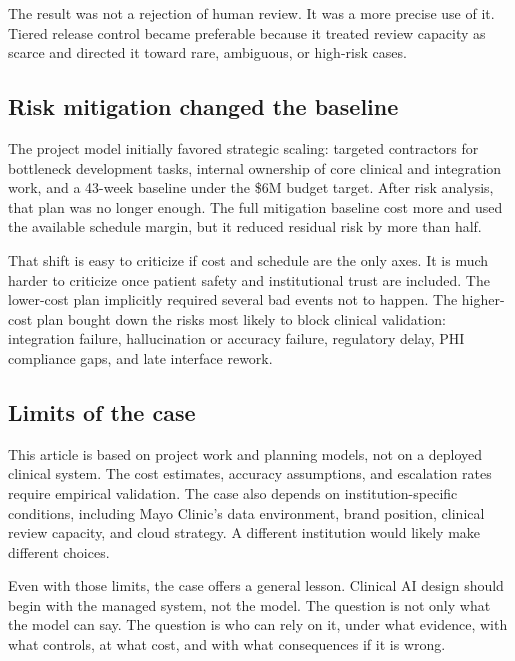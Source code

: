 The result was not a rejection of human review. It was a more precise use of it. Tiered release control became preferable because it treated review capacity as scarce and directed it toward rare, ambiguous, or high-risk cases.

\subsection{Risk mitigation changed the baseline}

The project model initially favored strategic scaling: targeted contractors for bottleneck development tasks, internal ownership of core clinical and integration work, and a 43-week baseline under the \$6M budget target. After risk analysis, that plan was no longer enough. The full mitigation baseline cost more and used the available schedule margin, but it reduced residual risk by more than half.

That shift is easy to criticize if cost and schedule are the only axes. It is much harder to criticize once patient safety and institutional trust are included. The lower-cost plan implicitly required several bad events not to happen. The higher-cost plan bought down the risks most likely to block clinical validation: integration failure, hallucination or accuracy failure, regulatory delay, PHI compliance gaps, and late interface rework.

\subsection{Limits of the case}

This article is based on project work and planning models, not on a deployed clinical system. The cost estimates, accuracy assumptions, and escalation rates require empirical validation. The case also depends on institution-specific conditions, including Mayo Clinic's data environment, brand position, clinical review capacity, and cloud strategy. A different institution would likely make different choices.

Even with those limits, the case offers a general lesson. Clinical AI design should begin with the managed system, not the model. The question is not only what the model can say. The question is who can rely on it, under what evidence, with what controls, at what cost, and with what consequences if it is wrong.
